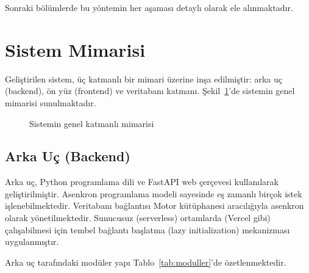 \documentclass[conference]{IEEEtran}
\begin{document}
Sonraki bölümlerde bu yöntemin her aşaması detaylı olarak ele alınmaktadır.

\section{Sistem Mimarisi}
\label{sec:mimari}

Geliştirilen sistem, üç katmanlı bir mimari üzerine inşa edilmiştir: arka uç (backend), ön yüz (frontend) ve veritabanı katmanı. Şekil~\ref{fig:mimari}'de sistemin genel mimarisi sunulmaktadır.

\begin{figure}[H]
\centering
{}
\caption{Sistemin genel katmanlı mimarisi}
\label{fig:mimari}
\end{figure}

\subsection{Arka Uç (Backend)}

Arka uç, Python programlama dili ve FastAPI web çerçevesi kullanılarak geliştirilmiştir. Asenkron programlama modeli sayesinde eş zamanlı birçok istek işlenebilmektedir. Veritabanı bağlantısı Motor kütüphanesi aracılığıyla asenkron olarak yönetilmektedir. Sunucusuz (serverless) ortamlarda (Vercel gibi) çalışabilmesi için tembel bağlantı başlatma (lazy initialization) mekanizması uygulanmıştır.

Arka uç tarafındaki modüler yapı Tablo~\ref{tab:moduller}'de özetlenmektedir.
\end{document}
